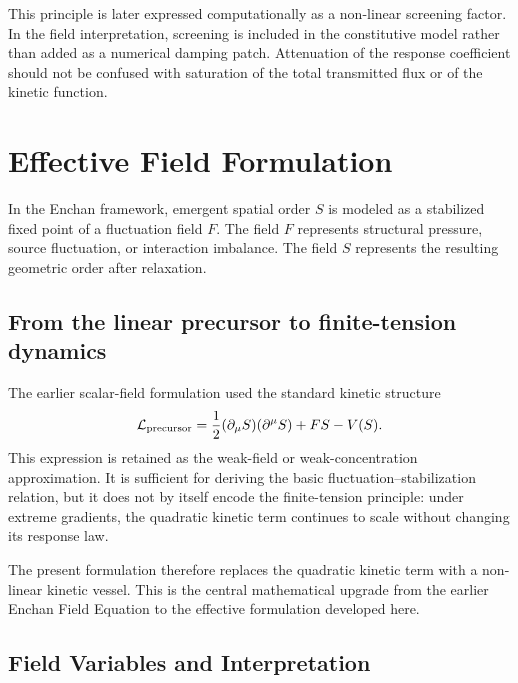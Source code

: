\documentclass[11pt,a4paper]{article}
\begin{document}
This principle is later expressed computationally as a non-linear screening factor. In the field interpretation, screening is included in the constitutive model rather than added as a numerical damping patch. Attenuation of the response coefficient should not be confused with saturation of the total transmitted flux or of the kinetic function.

\clearpage

\section{Effective Field Formulation}

In the Enchan framework, emergent spatial order $S$ is modeled as a stabilized fixed point of a fluctuation field $F$. The field $F$ represents structural pressure, source fluctuation, or interaction imbalance. The field $S$ represents the resulting geometric order after relaxation.

\subsection{From the linear precursor to finite-tension dynamics}

The earlier scalar-field formulation used the standard kinetic structure
\begin{equation}
\mathcal{L}_{\rm precursor}
= \frac{1}{2}(\partial_\mu S)(\partial^\mu S) + FS - V(S).
\end{equation}
This expression is retained as the weak-field or weak-concentration approximation. It is sufficient for deriving the basic fluctuation--stabilization relation, but it does not by itself encode the finite-tension principle: under extreme gradients, the quadratic kinetic term continues to scale without changing its response law.

The present formulation therefore replaces the quadratic kinetic term with a non-linear kinetic vessel. This is the central mathematical upgrade from the earlier Enchan Field Equation to the effective formulation developed here.

\subsection{Field Variables and Interpretation}
\end{document}
